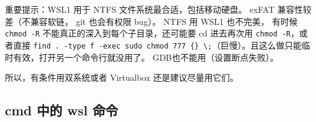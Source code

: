 
\begin{issues}
\issueDraft
\end{issues}

重要提示：WSL1 用于 NTFS 文件系统最合适，包括移动硬盘。 exFAT 兼容性较差（不兼容软链， git 也会有权限 bug）。 NTFS 用 WSL1 也不完美， 有时候 \verb|chmod -R| 不能真正的深入到每个子目录，还可能要 cd 进去再次用 \verb|chmod -R|，或者直接 \verb|find . -type f -exec sudo chmod 777 {} \;|（巨慢）。且这么做只能临时有效，打开另一个命令行就没用了。 GDB也不能用（设置断点失败）。

所以，有条件用双系统或者 Virtualbox 还是建议尽量用它们。

\subsection{cmd 中的 wsl 命令}
